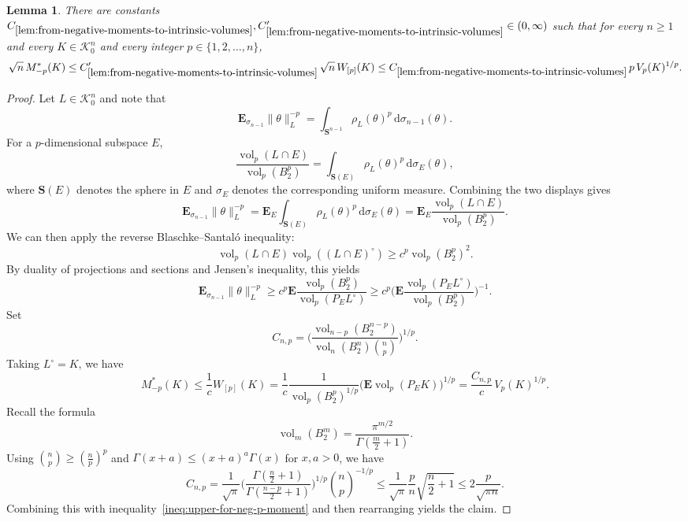 \documentclass[11pt]{amsart}
\newcommand{\sphere}{\mathbf{S}^{n-1}}
\newcommand{\E}{\mathbf E}
\newcommand{\Vol}{\operatorname{vol}}
\newcommand{\1}{\mathbf 1}
\newcommand{\ud}{\mathrm{d}}
\newcommand{\Bodies}{\mathcal{K}_0^n}
\let\vol\Vol
\theoremstyle{plain}
\newtheorem{lemma}[theorem]{Lemma}
\begin{document}
\begin{lemma}
\label{lem:from-negative-moments-to-intrinsic-volumes}
There are constants $C_{\ref{lem:from-negative-moments-to-intrinsic-volumes}}, C_{\ref{lem:from-negative-moments-to-intrinsic-volumes}}'\in (0, \infty)$ such that for every $n\geq 1$
and every $K\in \Bodies$ and every integer $p \in \{1, 2, \dots, n\}$, 
\[
\sqrt{n} \, M^\ast_{-p}(K)
\leq 
C_{\ref{lem:from-negative-moments-to-intrinsic-volumes}}' 
\, 
\sqrt{n} \, W_{[p]}(K) \leq 
C_{\ref{lem:from-negative-moments-to-intrinsic-volumes}}
\, p \, V_p(K)^{1/p}.
\]
\end{lemma}
\begin{proof}
Let $L \in \Bodies$ and note that 
\[
\E_{\sigma_{n-1}} \|\theta\|_{L}^{-p} = \int_{\sphere} \rho_L(\theta)^p \, \ud \sigma_{n-1}(\theta). 
\] 
For a $p$-dimensional subspace $E$, 
\[
\frac{\vol_p(L \cap E)}{\vol_p(B^p_2)} = \int_{\mathbf{S}(E)}  \rho_L(\theta)^p \, \ud \sigma_E(\theta), 
\]
where $\mathbf{S}(E)$ denotes the sphere in $E$ and
$\sigma_E$ denotes the corresponding uniform measure.
Combining the two displays gives
\[
\E_{\sigma_{n-1}} \|\theta\|_{L}^{-p}
= \E_E  \int_{\mathbf{S}(E)} \rho_L(\theta)^p \, \ud \sigma_E(\theta) = 
\E_E \frac{\vol_p(L \cap E)}{\vol_p(B^p_2)}. 
\]
We can then apply the reverse Blaschke--Santal\'o inequality:
\[
\vol_p(L \cap E) \vol_p((L \cap E)^\circ)\geq c^p \vol_p(B^p_2)^2. 
\]
By duality of projections and sections and Jensen's inequality, this yields
\[
\E_{\sigma_{n-1}} \|\theta\|_{L}^{-p} 
\geq c^p \E \frac{\vol_p(B^p_2)}{\vol_p(P_E L^\circ)}
\geq 
c^p 
\Big(\E \frac{\vol_p(P_E L^\circ)}{\vol_p(B^p_2)}\Big)^{-1}.
\]
Set
\[
C_{n,p} = \Big(\frac{\vol_{n-p}(B^{n-p}_2)}{\vol_n(B^n_2) \binom{n}{p}}\Big)^{1/p}.
\]
Taking $L^\circ = K$, we have 
\begin{equation}
\label{ineq:upper-for-neg-p-moment}    
M^\ast_{-p}(K) \leq \frac{1}{c} W_{[p]}(K) =  \frac{1}{c} \frac{1}{\vol_p(B^p_2)^{1/p}} 
\Big(\E \vol_p(P_EK) \Big)^{1/p}
= \frac{C_{n,p}}{c} \, V_p(K)^{1/p}.
\end{equation}
Recall the formula 
\[
\vol_m(B^m_2) = \frac{\pi^{m/2}}{\Gamma(\tfrac{m}{2} + 1)}.
\]
Using $\binom{n}{p} \geq (\tfrac{n}{p})^p$ and $\Gamma(x+a) \leq (x+a)^a \Gamma(x)$ for $x, a >0$,  we have 
\[
C_{n,p} = 
\frac{1}{\sqrt{\pi}} \Big(\frac{\Gamma(\tfrac{n}{2} + 1)}{\Gamma(\tfrac{n-p}{2} + 1)}\Big)^{1/p} \binom{n}{p}^{-1/p}  \leq 
\frac{1}{\sqrt{\pi}} \frac{p}{n} \sqrt{\frac{n}{2} + 1} \leq 2\frac{p}{\sqrt{\pi n}}.
\]
Combining this with inequality~\eqref{ineq:upper-for-neg-p-moment} and then rearranging yields the claim.
\end{proof}
\end{document}

